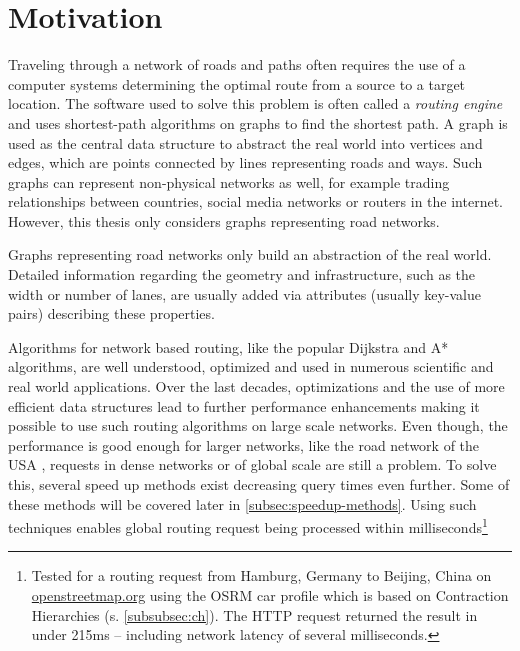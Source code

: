 
\section{Motivation}
	
	Traveling through a network of roads and paths often requires the use of a computer systems determining the optimal route from a source to a target location.
	The software used to solve this problem is often called a \emph{routing engine} and uses shortest-path algorithms on graphs to find the shortest path.
	A graph is used as the central data structure to abstract the real world into vertices and edges, which are points connected by lines representing roads and ways.
	Such graphs can represent non-physical networks as well, for example trading relationships between countries, social media networks or routers in the internet.
	However, this thesis only considers graphs representing road networks.
	
	Graphs representing road networks only build an abstraction of the real world.
	Detailed information regarding the geometry and infrastructure, such as the width or number of lanes, are usually added via attributes (usually key-value pairs) describing these properties.
	
	Algorithms for network based routing, like the popular Dijkstra and A* algorithms, are well understood, optimized and used in numerous scientific and real world applications.
	Over the last decades, optimizations and the use of more efficient data structures lead to further performance enhancements making it possible to use such routing algorithms on large scale networks.
	Even though, the performance is good enough for larger networks, like the road network of the USA \cite{aviram-optimizing-dijkstra}, requests in dense networks or of global scale are still a problem.
	To solve this, several speed up methods exist decreasing query times even further.
	Some of these methods will be covered later in \cref{subsec:speedup-methods}.
	Using such techniques enables global routing request being processed within milliseconds\footnote{Tested for a routing request from Hamburg, Germany to Beijing, China on \href{https://www.openstreetmap.org/directions?engine=fossgis\_osrm\_car&route=53.55\%2C10.00\%3B39.91\%2C116.39}{openstreetmap.org} using the OSRM car profile which is based on Contraction Hierarchies (s. \cref{subsubsec:ch}). The HTTP request returned the result in under 215ms -- including network latency of several milliseconds.}
	
